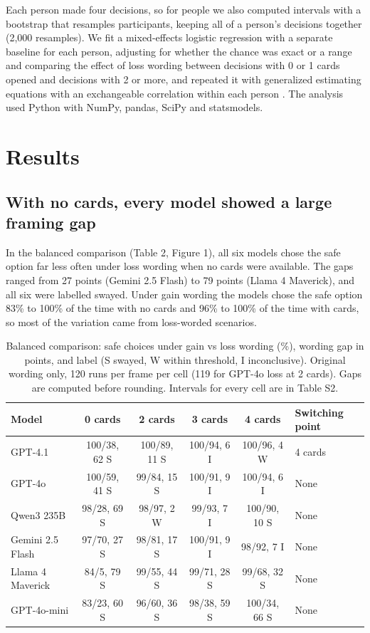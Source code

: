 \documentclass[11pt]{article}
\begin{document}
Each person made four decisions, so for people we also computed intervals with a bootstrap that resamples participants, keeping all of a person's decisions together (2,000 resamples). We fit a mixed-effects logistic regression with a separate baseline for each person, adjusting for whether the chance was exact or a range and comparing the effect of loss wording between decisions with 0 or 1 cards opened and decisions with 2 or more, and repeated it with generalized estimating equations with an exchangeable correlation within each person \citep{liang1986longitudinal}. The analysis used Python with NumPy, pandas, SciPy and statsmodels.

\section{Results}

\subsection{With no cards, every model showed a large framing gap}

In the balanced comparison (Table 2, Figure 1), all six models chose the safe option far less often under loss wording when no cards were available. The gaps ranged from 27 points (Gemini 2.5 Flash) to 79 points (Llama 4 Maverick), and all six were labelled swayed. Under gain wording the models chose the safe option 83\% to 100\% of the time with no cards and 96\% to 100\% of the time with cards, so most of the variation came from loss-worded scenarios.

\begin{table}[ht]
\centering
\footnotesize
\caption{Balanced comparison: safe choices under gain vs loss wording (\%), wording gap in points, and label (S swayed, W within threshold, I inconclusive). Original wording only, 120 runs per frame per cell (119 for GPT-4o loss at 2 cards). Gaps are computed before rounding. Intervals for every cell are in Table S2.}
\label{tab:2}
\setlength{\tabcolsep}{4pt}
\begin{tabular}{lccccl}
\toprule
Model & 0 cards & 2 cards & 3 cards & 4 cards & Switching point \\
\midrule
GPT-4.1 & 100/38, 62 S & 100/89, 11 S & 100/94, 6 I & 100/96, 4 W & 4 cards \\
GPT-4o & 100/59, 41 S & 99/84, 15 S & 100/91, 9 I & 100/94, 6 I & None \\
Qwen3 235B & 98/28, 69 S & 98/97, 2 W & 99/93, 7 I & 100/90, 10 S & None \\
Gemini 2.5 Flash & 97/70, 27 S & 98/81, 17 S & 100/91, 9 I & 98/92, 7 I & None \\
Llama 4 Maverick & 84/5, 79 S & 99/55, 44 S & 99/71, 28 S & 99/68, 32 S & None \\
GPT-4o-mini & 83/23, 60 S & 96/60, 36 S & 98/38, 59 S & 100/34, 66 S & None \\
\bottomrule
\end{tabular}
\end{table}
\end{document}
